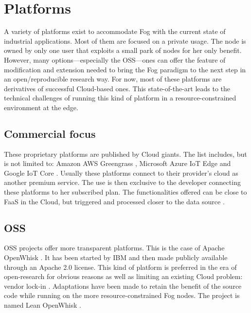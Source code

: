 \section{Platforms}
\label{sec:platforms}

A variety of platforms exist to accommodate Fog with the current state of industrial applications. Most of them are focused on a private usage. The node is owned by only one user that exploits a small park of nodes for her only benefit. However, many options—especially the \gls{OSS}—ones can offer the feature of modification and extension needed to bring the Fog paradigm to the next step in an open/reproducible research way. For now, most of these platforms are derivatives of successful Cloud-based ones. This state-of-the-art leads to the technical challenges of running this kind of platform in a resource-constrained environment at the edge.

\subsection{Commercial focus}

These proprietary platforms are published by Cloud giants. The list includes, but is not limited to: Amazon AWS Greengrass \cite{noauthor_aws_nodate}, Microsoft Azure IoT Edge \cite{noauthor_iot_nodate} and Google IoT Core \cite{noauthor_cloud_nodate}. Usually these platforms connect to their provider's cloud as another premium service. The use is then exclusive to the developer connecting these platforms to her subscribed plan. The functionalities offered can be close to \gls{FaaS} in the Cloud, but triggered and processed closer to the data source \cite{elgamal_costless_2018}.

\hypersetup{linkcolor=}
\subsection{\acrfull{OSS}}
\gls{OSS} projects offer more transparent platforms. This is the case of Apache OpenWhisk \cite{noauthor_apache_nodate}. It has been started by IBM and then made publicly available through an Apache 2.0 license. This kind of platform is preferred in the era of open-research for obvious reasons as well as limiting an existing Cloud problem: vendor lock-in \cite{kjorveziroski_iot_2021}. Adaptations have been made to retain the benefit of the source code while running on the more resource-constrained Fog nodes. The project is named Lean OpenWhisk \cite{breitgand_lean_2018}.

